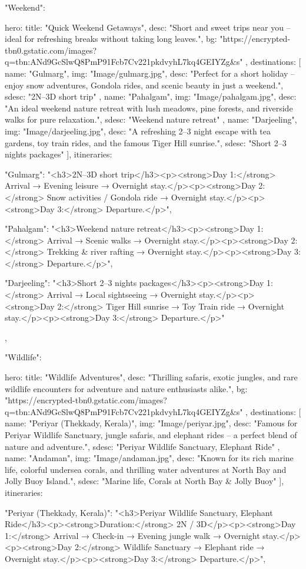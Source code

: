 {"Weekend": {
  hero: {
    title: "Quick Weekend Getaways",
    desc: "Short and sweet trips near you – ideal for refreshing breaks without taking long leaves.",
    bg: "https://encrypted-tbn0.gstatic.com/images?q=tbn:ANd9GcSlwQ8PmP91Fcb7Cv221pkdvyhL7kq4GEIYZg&s"
  },
  destinations: [
    { 
      name: "Gulmarg", 
      img: "Image/gulmarg.jpg", 
      desc: "Perfect for a short holiday – enjoy snow adventures, Gondola rides, and scenic beauty in just a weekend.", 
      sdesc: "2N–3D short trip" 
    },
    { 
      name: "Pahalgam", 
      img: "Image/pahalgam.jpg", 
      desc: "An ideal weekend nature retreat with lush meadows, pine forests, and riverside walks for pure relaxation.", 
      sdesc: "Weekend nature retreat" 
    },
    { 
      name: "Darjeeling", 
      img: "Image/darjeeling.jpg", 
      desc: "A refreshing 2–3 night escape with tea gardens, toy train rides, and the famous Tiger Hill sunrise.", 
      sdesc: "Short 2–3 nights packages" 
    }
  ],
  itineraries: {
    "Gulmarg": "<h3>2N–3D short trip</h3><p><strong>Day 1:</strong> Arrival → Evening leisure → Overnight stay.</p><p><strong>Day 2:</strong> Snow activities / Gondola ride → Overnight stay.</p><p><strong>Day 3:</strong> Departure.</p>",

    "Pahalgam": "<h3>Weekend nature retreat</h3><p><strong>Day 1:</strong> Arrival → Scenic walks → Overnight stay.</p><p><strong>Day 2:</strong> Trekking & river rafting → Overnight stay.</p><p><strong>Day 3:</strong> Departure.</p>",

    "Darjeeling": "<h3>Short 2–3 nights packages</h3><p><strong>Day 1:</strong> Arrival → Local sightseeing → Overnight stay.</p><p><strong>Day 2:</strong> Tiger Hill sunrise → Toy Train ride → Overnight stay.</p><p><strong>Day 3:</strong> Departure.</p>"
  }
},


"Wildlife": {
  hero: {
    title: "Wildlife Adventures",
    desc: "Thrilling safaris, exotic jungles, and rare wildlife encounters for adventure and nature enthusiasts alike.",
    bg: "https://encrypted-tbn0.gstatic.com/images?q=tbn:ANd9GcSlwQ8PmP91Fcb7Cv221pkdvyhL7kq4GEIYZg&s"
  },
  destinations: [
    { 
      name: "Periyar (Thekkady, Kerala)", 
      img: "Image/periyar.jpg", 
      desc: "Famous for Periyar Wildlife Sanctuary, jungle safaris, and elephant rides – a perfect blend of nature and adventure.", 
      sdesc: "Periyar Wildlife Sanctuary, Elephant Ride" 
    },
    { 
      name: "Andaman", 
      img: "Image/andaman.jpg", 
      desc: "Known for its rich marine life, colorful undersea corals, and thrilling water adventures at North Bay and Jolly Buoy Island.", 
      sdesc: "Marine life, Corals at North Bay & Jolly Buoy" 
    }
  ],
  itineraries: {
    "Periyar (Thekkady, Kerala)": "<h3>Periyar Wildlife Sanctuary, Elephant Ride</h3><p><strong>Duration:</strong> 2N / 3D</p><p><strong>Day 1:</strong> Arrival → Check-in → Evening jungle walk → Overnight stay.</p><p><strong>Day 2:</strong> Wildlife Sanctuary → Elephant ride → Overnight stay.</p><p><strong>Day 3:</strong> Departure.</p>",

}}}
